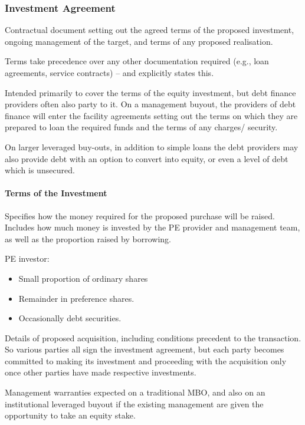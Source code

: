 \documentclass[
]{article}
\providecommand{\tightlist}{%
  \setlength{\itemsep}{0pt}\setlength{\parskip}{0pt}}
\begin{document}
\hypertarget{investment-agreement}{%
\subsubsection{Investment Agreement}\label{investment-agreement}}

Contractual document setting out the agreed terms of the proposed
investment, ongoing management of the target, and terms of any proposed
realisation.

Terms take precedence over any other documentation required (e.g., loan
agreements, service contracts) -- and explicitly states this.

Intended primarily to cover the terms of the equity investment, but debt
finance providers often also party to it. On a management buyout, the
providers of debt finance will enter the facility agreements setting out
the terms on which they are prepared to loan the required funds and the
terms of any charges/ security.

On larger leveraged buy-outs, in addition to simple loans the debt
providers may also provide debt with an option to convert into equity,
or even a level of debt which is unsecured.

\hypertarget{terms-of-the-investment}{%
\paragraph{Terms of the Investment}\label{terms-of-the-investment}}

Specifies how the money required for the proposed purchase will be
raised. Includes how much money is invested by the PE provider and
management team, as well as the proportion raised by borrowing.

PE investor:

\begin{itemize}
\tightlist
\item
  Small proportion of ordinary shares
\item
  Remainder in preference shares.
\item
  Occasionally debt securities.
\end{itemize}

Details of proposed acquisition, including conditions precedent to the
transaction. So various parties all sign the investment agreement, but
each party becomes committed to making its investment and proceeding
with the acquisition only once other parties have made respective
investments.

Management warranties expected on a traditional MBO, and also on an
institutional leveraged buyout if the existing management are given the
opportunity to take an equity stake.
\end{document}
